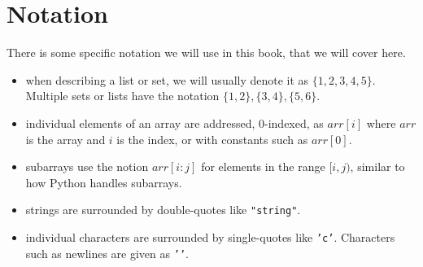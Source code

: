 \section*{Notation}

There is some specific notation we will use in this book, that we will cover here.
\begin{itemize}
\item when describing a list or set, we will usually denote it as $\{1,2,3,4,5\}$. Multiple sets or lists have the notation $\{1,2\},\{3,4\},\{5,6\}$.
\item individual elements of an array are addressed, 0-indexed, as $arr[i]$ where $arr$ is the array and $i$ is the index, or with constants such as $arr[0]$.
\item subarrays use the notion $arr[i:j]$ for elements in the range $[i,j)$, similar to how Python handles subarrays.
\item strings are surrounded by double-quotes like \texttt{"string"}.
\item individual characters are surrounded by single-quotes like \texttt{'c'}. Characters such as newlines are given as \texttt{'\n'}.
\end{itemize}